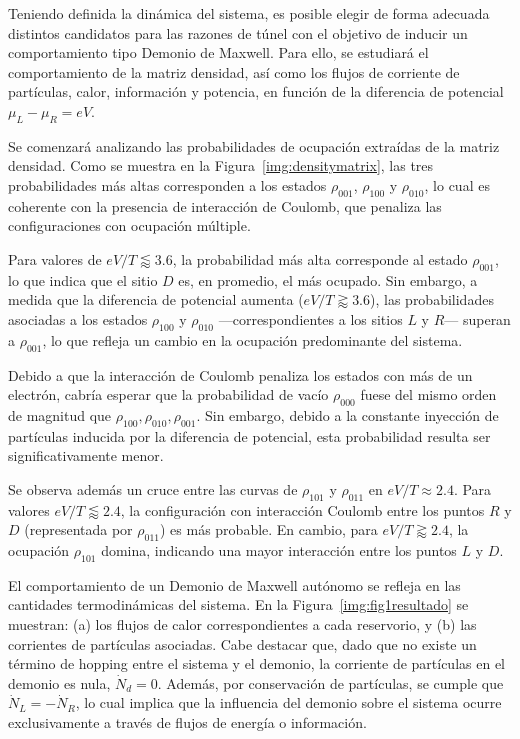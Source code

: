 
Teniendo definida la dinámica del sistema, es posible elegir de forma adecuada distintos candidatos para las razones de túnel con el objetivo de inducir un comportamiento tipo Demonio de Maxwell. Para ello, se estudiará el comportamiento de la matriz densidad, así como los flujos de corriente de partículas, calor, información y potencia, en función de la diferencia de potencial $\mu_{L} - \mu_{R} = eV$.

Se comenzará analizando las probabilidades de ocupación extraídas de la matriz densidad. Como se muestra en la Figura~\ref{img:densitymatrix}, las tres probabilidades más altas corresponden a los estados $\rho_{001}$, $\rho_{100}$ y $\rho_{010}$, lo cual es coherente con la presencia de interacción de Coulomb, que penaliza las configuraciones con ocupación múltiple.

Para valores de $eV/T \lessapprox 3.6$, la probabilidad más alta corresponde al estado $\rho_{001}$, lo que indica que el sitio $D$ es, en promedio, el más ocupado. Sin embargo, a medida que la diferencia de potencial aumenta ($eV/T \gtrapprox 3.6$), las probabilidades asociadas a los estados $\rho_{100}$ y $\rho_{010}$ —correspondientes a los sitios $L$ y $R$— superan a $\rho_{001}$, lo que refleja un cambio en la ocupación predominante del sistema.

Debido a que la interacción de Coulomb penaliza los estados con más de un electrón, cabría esperar que la probabilidad de vacío $\rho_{000}$ fuese del mismo orden de magnitud que $\rho_{100},\rho_{010},\rho_{001}$. Sin embargo, debido a la constante inyección de partículas inducida por la diferencia de potencial, esta probabilidad resulta ser significativamente menor. 

Se observa además un cruce entre las curvas de $\rho_{101}$ y $\rho_{011}$ en $eV/T \approx 2.4$. Para valores $eV/T \lessapprox 2.4$, la configuración con interacción Coulomb entre los puntos $R$ y $D$ (representada por $\rho_{011}$) es más probable. En cambio, para $eV/T \gtrapprox 2.4$, la ocupación $\rho_{101}$ domina, indicando una mayor interacción entre los puntos $L$ y $D$.



El comportamiento de un Demonio de Maxwell autónomo se refleja en las cantidades termodinámicas del sistema. En la Figura~\ref{img:fig1resultado} se muestran: (a) los flujos de calor correspondientes a cada reservorio, y (b) las corrientes de partículas asociadas. Cabe destacar que, dado que no existe un término de hopping entre el sistema y el demonio, la corriente de partículas en el demonio es nula, $\dot{N}_{d} = 0$. Además, por conservación de partículas, se cumple que $\dot{N}_{L} = -\dot{N}_{R}$, lo cual implica que la influencia del demonio sobre el sistema ocurre exclusivamente a través de flujos de energía o información.

